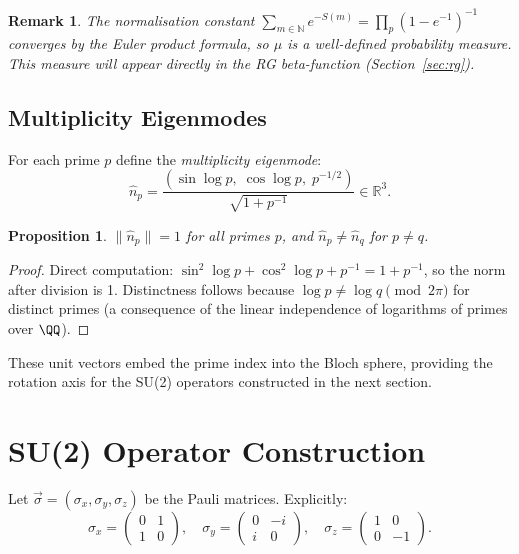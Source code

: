 \documentclass[11pt]{article}
\newtheorem{proposition}{Proposition}[section]
\newtheorem{remark}{Remark}[section]
\newcommand{\NN}{\mathbb{N}}
\newcommand{\RR}{\mathbb{R}}
\newcommand{\hatN}[1]{\hat{n}_{#1}}
\begin{document}
\begin{remark}
The normalisation constant $\sum_{m\in\NN}e^{-S(m)} = \prod_p(1-e^{-1})^{-1}$ converges by the Euler product formula, so $\mu$ is a well-defined probability measure. This measure will appear directly in the RG beta-function (Section~\ref{sec:rg}).
\end{remark}

\subsection{Multiplicity Eigenmodes}

For each prime $p$ define the \emph{multiplicity eigenmode}:
\[
\hatN{p} = \frac{(\sin\log p,\;\cos\log p,\;p^{-1/2})}{\sqrt{1+p^{-1}}}\in\RR^3.
\]

\begin{proposition}
$\|\hatN{p}\|=1$ for all primes $p$, and $\hatN{p}\neq\hatN{q}$ for $p\neq q$.
\end{proposition}

\begin{proof}
Direct computation: $\sin^2\log p+\cos^2\log p+p^{-1}=1+p^{-1}$, so the norm after division is 1. Distinctness follows because $\log p\neq\log q\pmod{2\pi}$ for distinct primes (a consequence of the linear independence of logarithms of primes over $\QQ$).
\end{proof}

These unit vectors embed the prime index into the Bloch sphere, providing the rotation axis for the SU(2) operators constructed in the next section.

\section{SU(2) Operator Construction}

Let $\vec{\sigma}=(\sigma_x,\sigma_y,\sigma_z)$ be the Pauli matrices. Explicitly:
\[
\sigma_x=\begin{pmatrix}0&1\\1&0\end{pmatrix},\quad
\sigma_y=\begin{pmatrix}0&-i\\i&0\end{pmatrix},\quad
\sigma_z=\begin{pmatrix}1&0\\0&-1\end{pmatrix}.
\]
\end{document}
